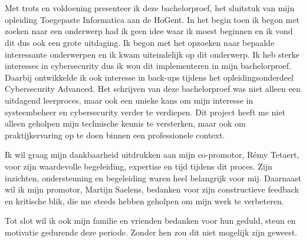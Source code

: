 
\chapter*{}%
\label{ch:voorwoord}


Met trots en voldoening presenteer ik deze bachelorproef, het sluitstuk van mijn opleiding Toegepaste Informatica aan de HoGent. In het begin toen ik begon met zoeken naar een onderwerp had ik geen idee waar ik moest beginnen en ik vond dit dus ook een grote uitdaging. Ik begon met het opzoeken naar bepaalde interessante onderwerpen en ik kwam uiteindelijk op dit onderwerp. Ik heb sterke interesses in cybersecurity dus ik wou dit implementeren in mijn bachelorproef. Daarbij ontwikkelde ik ook interesse in back-ups tijdens het opleidingsonderdeel Cybersecurity Advanced. Het schrijven van deze bachelorproef was niet alleen een uitdagend leerproces, maar ook een unieke kans om mijn interesse in systeembeheer en cybersecurity verder te verdiepen. Dit project heeft me niet alleen geholpen mijn technische kennis te versterken, maar ook om praktijkervaring op te doen binnen een professionele context.

Ik wil graag mijn dankbaarheid uitdrukken aan mijn co-promotor, Rémy Tetaert, voor zijn waardevolle begeleiding, expertise en tijd tijdens dit proces. Zijn inzichten, ondersteuning en begeleiding waren heel belangrijk voor mij. Daarnaast wil ik mijn promotor, Martijn Saelens, bedanken voor zijn constructieve feedback en kritische blik, die me steeds hebben geholpen om mijn werk te verbeteren. 

Tot slot wil ik ook mijn familie en vrienden bedanken voor hun geduld, steun en motivatie gedurende deze periode. Zonder hen zou dit niet mogelijk zijn geweest.

